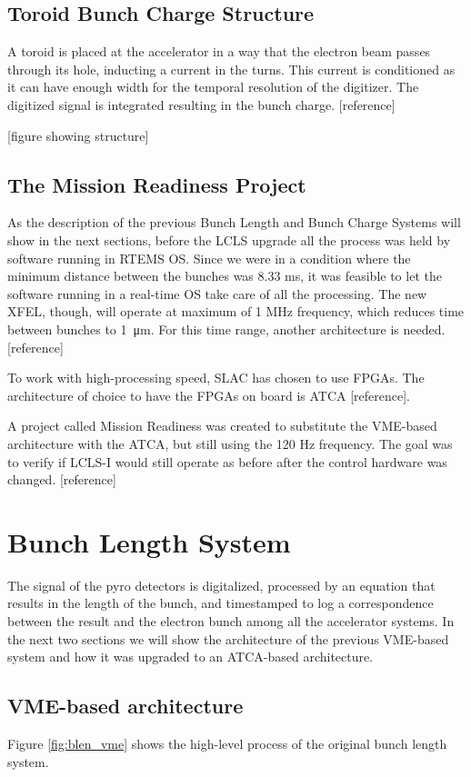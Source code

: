 \documentclass[letter,
               biblatex,     %
               keeplastbox,   %
               ]{jacow}
\begin{document}
\subsection{Toroid Bunch Charge Structure}
A toroid is placed at the accelerator in a way that the electron beam passes through its hole, inducting a current in the turns. This current is conditioned as it can have enough width for the temporal resolution of the digitizer. The digitized signal is integrated resulting in the bunch charge. [reference]

[figure showing structure]

\subsection{The Mission Readiness Project}
As the description of the previous Bunch Length and Bunch Charge Systems will show in the next sections, before the LCLS upgrade all the process was held by software running in RTEMS OS. Since we were in a condition where the minimum distance between the bunches was 8.33 ms, it was feasible to let the software running in a real-time OS take care of all the processing. The new XFEL, though, will operate at maximum of 1 MHz frequency, which reduces time between bunches to \SI{1}{\micro\meter}. For this time range, another architecture is needed. [reference]

To work with high-processing speed, SLAC has chosen to use FPGAs. The architecture of choice to have the FPGAs on board is ATCA [reference].

A project called Mission Readiness was created to substitute the VME-based architecture with the ATCA, but still using the 120 Hz frequency. The goal was to verify if LCLS-I would still operate as before after the control hardware was changed. [reference]

\section{Bunch Length System}
The signal of the pyro detectors is digitalized, processed by an equation that results in the length of the bunch, and timestamped to log a correspondence between the result and the electron bunch among all the accelerator systems. In the next two sections we will show the architecture of the previous VME-based system and how it was upgraded to an ATCA-based architecture.

\subsection{VME-based architecture}
Figure \ref{fig:blen_vme} shows the high-level process of the original bunch length system.
\end{document}
